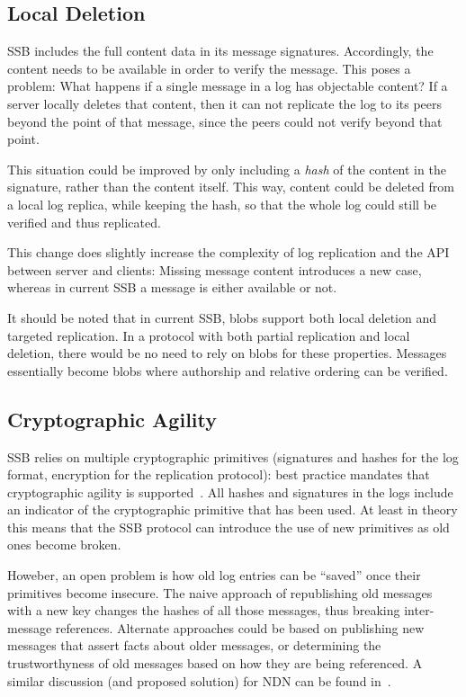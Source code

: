 \documentclass[10pt,sigconf]{acmart}
\begin{document}
\subsection{Local Deletion}

SSB includes the full content data in its message signatures. Accordingly, the content needs to be available in order to verify the message. This poses a problem: What happens if a single message in a log has objectable content? If a server locally deletes that content, then it can not replicate the log to its peers beyond the point of that message, since the peers could not verify beyond that point.

This situation could be improved by only including a {\em hash} of the content in the signature, rather than the content itself. This way, content could be deleted from a local log replica, while keeping the hash, so that the whole log could still be verified and thus replicated.

This change does slightly increase the complexity of log replication and the API between server and clients: Missing message content introduces a new case, whereas in current SSB a message is either available or not.

It should be noted that in current SSB, blobs support both local deletion and targeted replication. In a protocol with both partial replication and local deletion, there would be no need to rely on blobs for these properties. Messages essentially become blobs where authorship and relative ordering can be verified.

\subsection{Cryptographic Agility}


SSB relies on multiple cryptographic primitives (signatures and hashes for the log format, encryption for the replication protocol): best practice mandates that cryptographic agility is supported~\cite{nelson2011crypto}. All hashes and signatures in the logs include an indicator of the cryptographic primitive that has been used. At least in theory this means that the SSB protocol can introduce the use of new primitives as old ones become broken.

Howeber, an open problem is how old log entries can be ``saved'' once their primitives become insecure. The naive approach of republishing old messages with a new key changes the hashes of all those messages, thus breaking inter-message references. Alternate approaches could be based on publishing new messages that assert facts about older messages, or determining the trustworthyness of old messages based on how they are being referenced. A similar discussion (and proposed solution) for NDN can be found in~\cite{DeLorean}.
\end{document}
